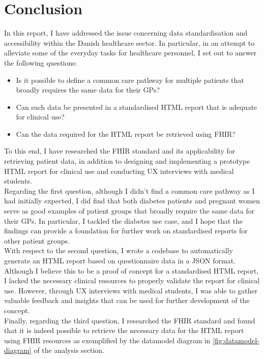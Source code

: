 \section{Conclusion}
In this report, I have addressed the issue concerning data standardisation and accessibility within the Danish healthcare sector. In particular, in an attempt to alleviate some of the everyday tasks for healthcare personnel, I set out to answer the following questions:
\begin{itemize}
    \item Is it possible to define a common care pathway for multiple patients that broadly requires the same data for their GPs?
    \item Can such data be presented in a standardised HTML report that is adequate for clinical use?
    \item Can the data required for the HTML report be retrieved using FHIR?
\end{itemize} 
To this end, I have researched the FHIR standard and its applicability for retrieving patient data, in addition to designing and implementing a prototype HTML report for clinical use and conducting UX interviews with medical students.
\\
Regarding the first question, although I didn't find a common care pathway as I had initially expected, I did find that both diabetes patients and pregnant women serve as good examples of patient groups that broadly require the same data for their GPs. In particular, I tackled the diabetes use case, and I hope that the findings can provide a foundation for further work on standardised reports for other patient groups.
\\
With respect to the second question, I wrote a codebase to automatically generate an HTML report based on questionnaire data in a JSON format. Although I believe this to be a proof of concept for a standardised HTML report, I lacked the necessary clinical resources to properly validate the report for clinical use. However, through UX interviews with medical students, I was able to gather valuable feedback and insights that can be used for further development of the concept.
\\
Finally, regarding the third question, I researched the FHIR standard and found that it is indeed possible to retrieve the necessary data for the HTML report using FHIR resources as exemplified by the datamodel diagram in \autoref{fig:datamodel-diagram} of the analysis section.
